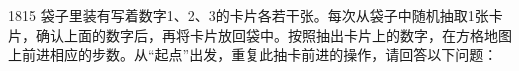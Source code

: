\begin{question}{18}{15}
袋子里装有写着数字1、2、3的卡片各若干张。每次从袋子中随机抽取1张卡片，确认上面的数字后，再将卡片放回袋中。按照抽出卡片上的数字，在方格地图上前进相应的步数。从“起点”出发，重复此抽卡前进的操作，请回答以下问题：

\begin{choices}
\end{choices}

\answerspace

\answerspace
\end{question}
